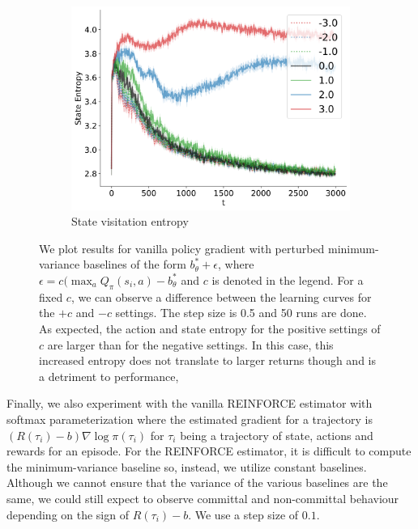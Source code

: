 \begin{figure}[!ht]
\begin{subfigure}[b]{0.32\linewidth}
    \includegraphics[width=\textwidth]{articles/baselines/figs/baseline_4rooms/VPG_relative_perturb_State_Entropy.png}
    \caption{State visitation entropy}
  \end{subfigure}
  \caption{We plot results for vanilla policy gradient with perturbed minimum-variance baselines of the form $b^\ast_\theta + \epsilon$, where $\epsilon = c (\max_a Q_\pi(s_i,a) - b^*_\theta$ and $c$ is denoted in the legend. For a fixed $c$, we can observe a difference between the learning curves for the $+c$ and $-c$ settings. The step size is 0.5 and 50 runs are done. As expected, the action and state entropy for the positive settings of $c$ are larger than for the negative settings. In this case, this increased entropy does not translate to larger returns though and is a detriment to performance,  ~\label{appfig:4rooms_vpg_absolute_perturb}}
\end{figure}


Finally, we also experiment with the vanilla REINFORCE estimator with softmax parameterization where the estimated gradient for a trajectory is $(R(\tau_i) -b ) \nabla \log \pi(\tau_i)$ for $\tau_i$ being a trajectory of state, actions and rewards for an episode. For the REINFORCE estimator, it is difficult to compute the minimum-variance baseline so, instead, we utilize constant baselines.
Although we cannot ensure that the variance of the various baselines are the same, we could still expect to observe committal and non-committal behaviour depending on the sign of $R(\tau_i) -b$.  We use a step size of $0.1$. 


